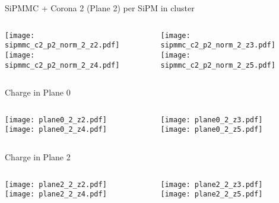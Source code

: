 \documentclass{beamer}
\begin{document}
\begin{frame}{SiPMMC + Corona 2 (Plane 2) per SiPM in cluster}
	\begin{columns}[onlytextwidth]
		\begin{column}{0.5\textwidth}
			\texttt{[image: sipmmc\_c2\_p2\_norm\_2\_z2.pdf]} \\
			\texttt{[image: sipmmc\_c2\_p2\_norm\_2\_z4.pdf]}
		 \end{column}
		 \begin{column}{0.5\textwidth}
			\texttt{[image: sipmmc\_c2\_p2\_norm\_2\_z3.pdf]} \\
			\texttt{[image: sipmmc\_c2\_p2\_norm\_2\_z5.pdf]}
		 \end{column}
 \end{columns}
\end{frame}

\begin{frame}{Charge in Plane 0}
	\begin{columns}[onlytextwidth]
		\begin{column}{0.5\textwidth}
			\texttt{[image: plane0\_2\_z2.pdf]} \\
			\texttt{[image: plane0\_2\_z4.pdf]}
		 \end{column}
		 \begin{column}{0.5\textwidth}
			\texttt{[image: plane0\_2\_z3.pdf]} \\
			\texttt{[image: plane0\_2\_z5.pdf]}
		 \end{column}
 \end{columns}
\end{frame}

\begin{frame}{Charge in Plane 2}
	\begin{columns}[onlytextwidth]
		\begin{column}{0.5\textwidth}
			\texttt{[image: plane2\_2\_z2.pdf]} \\
			\texttt{[image: plane2\_2\_z4.pdf]}
		 \end{column}
		 \begin{column}{0.5\textwidth}
			\texttt{[image: plane2\_2\_z3.pdf]} \\
			\texttt{[image: plane2\_2\_z5.pdf]}
		 \end{column}
 \end{columns}
\end{frame}
\end{document}
